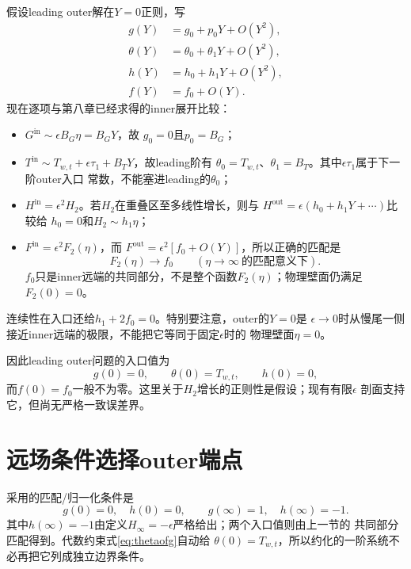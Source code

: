 \documentclass[UTF8,zihao=-4,openany]{ctexbook}
\newcommand{\eps}{\epsilon}
\begin{document}
假设leading outer解在$Y=0$正则，写
\begin{subequations}\label{eq:outerentrance}
\begin{align}
 g(Y)&=g_0+p_0Y+O(Y^2),\\
 \theta(Y)&=\theta_0+\theta_1Y+O(Y^2),\\
 h(Y)&=h_0+h_1Y+O(Y^2),\\
 f(Y)&=f_0+O(Y).
\end{align}
\end{subequations}
现在逐项与第八章已经求得的inner展开比较：

\begin{itemize}
  \item $G^{\mathrm{in}}\sim\eps B_G\eta=B_GY$，故
  $g_0=0$且$p_0=B_G$；
  \item $T^{\mathrm{in}}\sim T_{w,t}+\eps\tau_1+B_TY$，故leading阶有
  $\theta_0=T_{w,t}$、$\theta_1=B_T$。其中$\eps\tau_1$属于下一阶outer入口
  常数，不能塞进leading的$\theta_0$；
  \item $H^{\mathrm{in}}=\eps^2H_2$。若$H_2$在重叠区至多线性增长，则与
  $H^{\mathrm{out}}=\eps(h_0+h_1Y+\cdots)$比较给
  $h_0=0$和$H_2\sim h_1\eta$；
  \item $F^{\mathrm{in}}=\eps^2F_2(\eta)$，而
  $F^{\mathrm{out}}=\eps^2[f_0+O(Y)]$，所以正确的匹配是
  \begin{equation}\label{eq:Fmatching}
    F_2(\eta)\longrightarrow f_0
    \qquad(\eta\to\infty\ \text{的匹配意义下}).
  \end{equation}
  $f_0$只是inner远端的共同部分，不是整个函数$F_2(\eta)$；物理壁面仍满足
  $F_2(0)=0$。
\end{itemize}

连续性在入口还给$h_1+2f_0=0$。特别要注意，outer的$Y=0$是
$\eps\to0$时从慢尾一侧接近inner远端的极限，不能把它等同于固定$\eps$时的
物理壁面$\eta=0$。

因此leading outer问题的入口值为
\begin{equation}\label{eq:outerentrancebc}
 g(0)=0,\qquad \theta(0)=T_{w,t},\qquad h(0)=0,
\end{equation}
而$f(0)=f_0$一般不为零。这里关于$H_2$增长的正则性是假设；现有有限$\eps$
剖面支持它，但尚无严格一致误差界。

\section{远场条件选择outer端点}

采用的匹配/归一化条件是
\begin{equation}\label{eq:outerbc}
 g(0)=0,\quad h(0)=0,\qquad
 g(\infty)=1,\quad h(\infty)=-1.
\end{equation}
其中$h(\infty)=-1$由定义$H_\infty=-\eps$严格给出；两个入口值则由上一节的
共同部分匹配得到。代数约束式\eqref{eq:thetaofg}自动给
$\theta(0)=T_{w,t}$，所以约化的一阶系统不必再把它列成独立边界条件。
\end{document}
